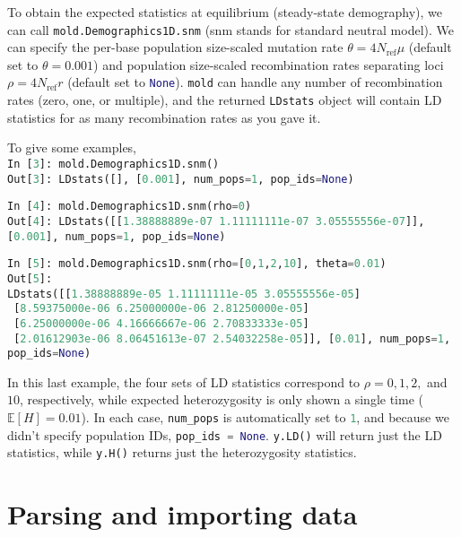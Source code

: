 \documentclass[10pt]{article}
\makeatletter
\newcommand{\mold}{\texttt{mold}\xspace}
\newcommand{\py}[1]{\lstinline[breaklines=true,language=Python, showstringspaces=False]@#1@}
\newcommand{\E}{\mathbb{E}}
\makeatother
\begin{document}
To obtain the expected statistics at equilibrium (steady-state demography), we can call \py{mold.Demographics1D.snm} (snm stands for standard neutral model).
We can specify the per-base population size-scaled mutation rate $\theta = 4N_\text{ref}\mu$ (default set to $\theta=0.001$) and population size-scaled recombination rates separating loci $\rho=4 N_\text{ref} r$ (default set to \py{None}).
\mold can handle any number of recombination rates (zero, one, or multiple), and the returned \py{LDstats} object will contain LD statistics for as many recombination rates as you gave it.

To give some examples,\\
\py{In [3]: mold.Demographics1D.snm()}\\
\py{Out[3]: LDstats([], [0.001], num_pops=1, pop_ids=None)}

\py{In [4]: mold.Demographics1D.snm(rho=0)}\\
\py{Out[4]: LDstats([[1.38888889e-07 1.11111111e-07 3.05555556e-07]], [0.001], num_pops=1, pop_ids=None)}

\py{In [5]: mold.Demographics1D.snm(rho=[0,1,2,10], theta=0.01)}\\
\py{Out[5]:}\\
\py{LDstats([[1.38888889e-05 1.11111111e-05 3.05555556e-05]}\\
\py{ [8.59375000e-06 6.25000000e-06 2.81250000e-05]}\\
\py{ [6.25000000e-06 4.16666667e-06 2.70833333e-05]}\\
\py{ [2.01612903e-06 8.06451613e-07 2.54032258e-05]], [0.01], num_pops=1, pop_ids=None)}

In this last example, the four sets of LD statistics correspond to $\rho=0,1,2,$ and $10$, respectively, while expected heterozygosity is only shown a single time ($\E[H]=0.01$).
In each case, \py{num_pops} is automatically set to \py{1}, and because we didn't specify population IDs, \py{pop_ids = None}.
\py{y.LD()} will return just the LD statistics, while \py{y.H()} returns just the heterozygosity statistics.



\section{Parsing and importing data}
\end{document}
